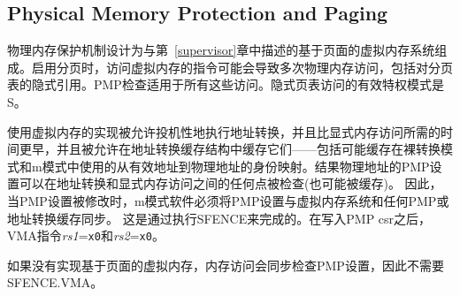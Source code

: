 \subsection{Physical Memory Protection and Paging}
\label{pmp-vmem}

\iffalse
The Physical Memory Protection mechanism is designed to compose with the
page-based virtual memory systems described in Chapter~\ref{supervisor}.  When
paging is enabled, instructions that access virtual memory may result in
multiple physical-memory accesses, including implicit references to the page
tables.  The PMP checks apply to all of these accesses.  The effective
privilege mode for implicit page-table accesses is S.
\fi
物理内存保护机制设计为与第~\ref{supervisor}章中描述的基于页面的虚拟内存系统组成。启用分页时，访问虚拟内存的指令可能会导致多次物理内存访问，包括对分页表的隐式引用。PMP检查适用于所有这些访问。隐式页表访问的有效特权模式是S。

\iffalse
Implementations with virtual memory are permitted to perform address
translations speculatively and earlier than required by an explicit memory
access, and are permitted to cache them in address translation cache
structures---including possibly caching the identity mappings from effective
address to physical address used in Bare translation modes and M-mode.  The
PMP settings for the resulting physical address may be checked (and possibly
cached) at any point between the address translation and the explicit memory
access.
Hence, when the PMP settings are modified, M-mode software must
synchronize the PMP settings with the virtual memory system and
any PMP or address-translation caches.
This is
accomplished by executing an SFENCE.VMA instruction with {\em rs1}={\tt x0}
and {\em rs2}={\tt x0}, after the PMP CSRs are written.
\fi
使用虚拟内存的实现被允许投机性地执行地址转换，并且比显式内存访问所需的时间更早，并且被允许在地址转换缓存结构中缓存它们——包括可能缓存在裸转换模式和m模式中使用的从有效地址到物理地址的身份映射。结果物理地址的PMP设置可以在地址转换和显式内存访问之间的任何点被检查(也可能被缓存)。
因此，当PMP设置被修改时，m模式软件必须将PMP设置与虚拟内存系统和任何PMP或地址转换缓存同步。
这是通过执行SFENCE来完成的。在写入PMP csr之后，VMA指令{\em rs1}={\tt x0}和{\em rs2}={\tt x0}。

\iffalse
If page-based virtual memory is not implemented,
memory accesses check the PMP settings synchronously, so no SFENCE.VMA is needed.
\fi
如果没有实现基于页面的虚拟内存，内存访问会同步检查PMP设置，因此不需要SFENCE.VMA。
